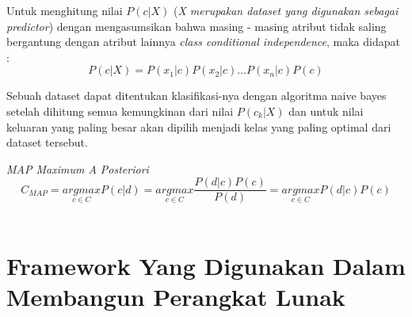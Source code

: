 Untuk menghitung nilai $P(c|X)$ (\textit{X merupakan dataset yang digunakan sebagai predictor}) dengan mengasumsikan bahwa masing - masing atribut tidak saling bergantung dengan atribut lainnya \textit{class conditional independence}, maka didapat : 
\begin{equation}
	P(c|X) = P(x_1|c) P(x_2|c) ... P(x_n|c) P(c)
\end{equation}

Sebuah dataset dapat ditentukan klasifikasi-nya dengan algoritma naive bayes setelah dihitung semua kemungkinan dari nilai $P(c_k|X)$ dan untuk nilai keluaran yang paling besar akan dipilih menjadi kelas yang paling optimal dari dataset tersebut.

\textit{MAP Maximum A Posteriori}
		\begin{equation}
			C_{MAP} = \underset{c \in C}{ argmax } P(c|d) = \underset{c \in C}{ argmax } \dfrac{P(d|c) P(c)}{P(d)} = \underset{c \in C}{ argmax } P(d|c) P(c)
		\end{equation} \\
	
\section{Framework Yang Digunakan Dalam Membangun Perangkat Lunak}
